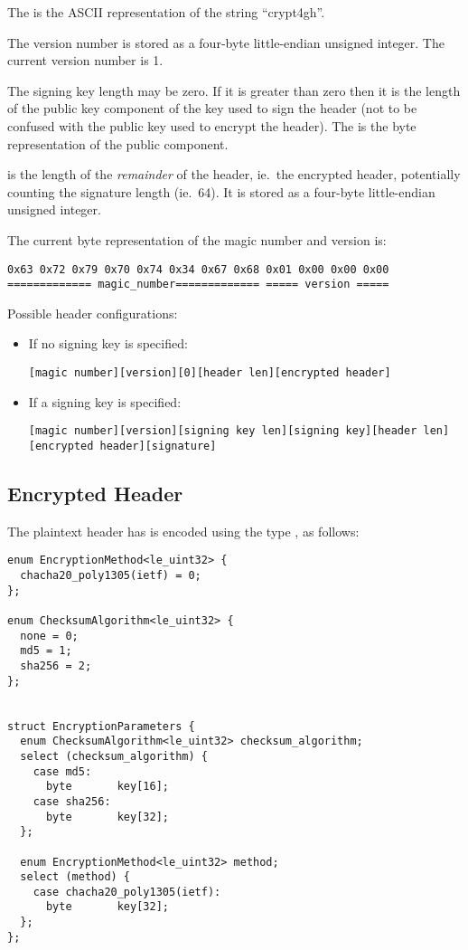 The  is the ASCII representation of the string ``crypt4gh''.

The version number is stored as a four-byte little-endian unsigned integer.
%
The current version number is 1.

The signing key length may be zero.
%
If it is greater than zero then it is the length of the public key
component of the key used to sign the header (not to be confused with
the public key used to encrypt the header).
%
The  is the byte representation of the public
component.

 is the length of the \emph{remainder} of the header,
ie.\ the encrypted header, potentially counting the signature length
(ie.\ 64).
%
It is stored as a four-byte little-endian unsigned integer.

The current byte representation of the magic number and version is:
\begin{verbatim}
0x63 0x72 0x79 0x70 0x74 0x34 0x67 0x68 0x01 0x00 0x00 0x00
============= magic_number============= ===== version =====
\end{verbatim}

Possible header configurations:
%
\begin{itemize}
%
\item If no signing key is specified:
\begin{verbatim}
[magic number][version][0][header len][encrypted header]
\end{verbatim}
%
\item If a signing key is specified:
\begin{verbatim}
[magic number][version][signing key len][signing key][header len][encrypted header][signature]
\end{verbatim}
%
\end{itemize}


\subsection{Encrypted Header}
%

The plaintext header has is encoded using the type
, as follows:

\begin{verbatim}
enum EncryptionMethod<le_uint32> {
  chacha20_poly1305(ietf) = 0;
};

enum ChecksumAlgorithm<le_uint32> {
  none = 0;
  md5 = 1;
  sha256 = 2;
};


struct EncryptionParameters {
  enum ChecksumAlgorithm<le_uint32> checksum_algorithm;
  select (checksum_algorithm) {
    case md5:
      byte       key[16];
    case sha256:
      byte       key[32];
  };

  enum EncryptionMethod<le_uint32> method;
  select (method) {
    case chacha20_poly1305(ietf):
      byte       key[32];
  };
};
\end{verbatim}

